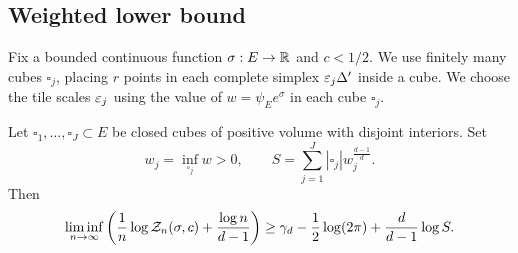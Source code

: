 \documentclass[11pt,letterpaper]{article}
\begin{document}
\subsection{Weighted lower bound}
Fix a bounded continuous function $\sigma:E\to\mathbb R$ and $c<1/2$.
We use finitely many cubes $\square_j$, placing $r$ points in each complete simplex $\varepsilon_j\Delta'$ inside a cube. We choose the tile scales $\varepsilon_{j}$ using the value of $w=\psi_Ee^\sigma$ in each cube $\square_{j}$.

\begin{lemma}\label{lem:cube-lower}
      Let $\square_1,\ldots,\square_J\subset E$ be closed cubes of positive volume with disjoint interiors. Set
      \[
            w_j=\inf_{\square_j}w>0,\qquad S=\sum_{j=1}^J|\square_j|w_j^{\frac{d-1}{d}}.
      \]
      Then
      \begin{equation}\label{eq:lower-rate}
            \liminf_{n\to\infty}\left(\frac1n\log\mathcal Z_n(\sigma,c)+\frac{\log n}{d-1}\right)
            \ge\gamma_d-\frac12\log(2\pi)+\frac d{d-1}\log S.
      \end{equation}
\end{lemma}
\end{document}
